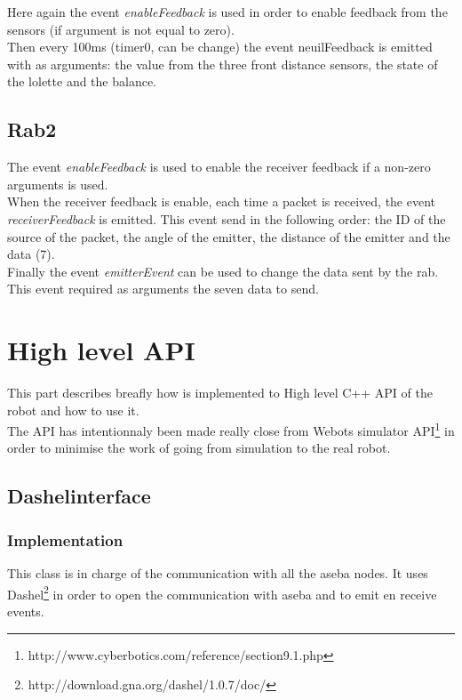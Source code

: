 \documentclass[a4paper,11pt]{report}
\begin{document}
Here again the event \textit{enableFeedback} is used in order to enable feedback from the sensors (if argument is not equal to zero).\\

Then every 100ms (timer0, can be change) the event neuilFeedback is emitted with as arguments: the value from the three front distance sensors, the state of the lolette and the balance.\\

\section{Rab2}
The event \textit{enableFeedback} is used to enable the receiver feedback if a non-zero arguments is used.\\

When the receiver feedback is enable, each time a packet is received, the event \textit{receiverFeedback} is emitted. This event send in the following order: the ID of the source of the packet, the angle of the emitter, the distance of the emitter and the data (7).\\

Finally the event \textit{emitterEvent} can be used to change the data sent by the rab. This event required as arguments the seven data to send.\\



\newpage
\chapter{High level API}
This part describes breafly how is implemented to High level C++ API of the robot and how to use it.\\

The API has intentionnaly been made really close from Webots simulator API\footnote{http://www.cyberbotics.com/reference/section9.1.php} in order to minimise the work of going from simulation to the real robot.\\

\section{Dashelinterface}
\subsection{Implementation}
This class is in charge of the communication with all the aseba nodes. It uses Dashel\footnote{http://download.gna.org/dashel/1.0.7/doc/} in order to open the communication with aseba and to emit en receive events.\\
\end{document}
